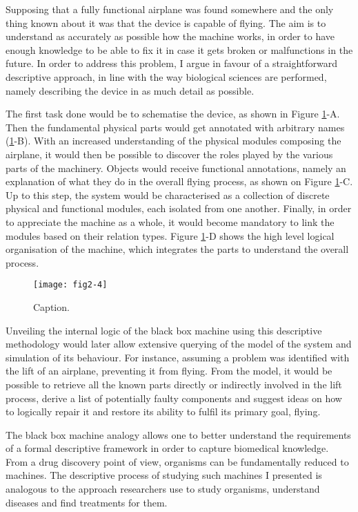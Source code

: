 Supposing that a fully functional airplane was found somewhere and the only thing known about it was that the device is capable of flying. The aim is to understand as accurately as possible how the machine works, in order to have enough knowledge to be able to fix it in case it gets broken or malfunctions in the future. In order to address this problem, I argue in favour of a straightforward descriptive approach, in line with the way biological sciences are performed, namely describing the device in as much detail as possible.

The first task done would be to schematise the device, as shown in Figure \ref{fig2-4}-A. Then the fundamental physical parts would get annotated with arbitrary names (\ref{fig2-4}-B). With an increased understanding of the physical modules composing the airplane, it would then be possible to discover the roles played by the various parts of the machinery. Objects would receive functional annotations, namely an explanation of what they do in the overall flying process, as shown on Figure \ref{fig2-4}-C. Up to this step, the system would be characterised as a collection of discrete physical and functional modules, each isolated from one another. Finally, in order to appreciate the machine as a whole, it would become mandatory to link the modules based on their relation types. Figure \ref{fig2-4}-D shows the high level logical organisation of the machine, which integrates the parts to understand the overall process.

\begin{figure}[H]
    \centering
    \texttt{[image: fig2-4]}
    \caption{Caption.}
    \label{fig2-4}
\end{figure}

Unveiling the internal logic of the black box machine using this descriptive methodology would later allow extensive querying of the model of the system and simulation of its behaviour. For instance, assuming a problem was identified with the lift of an airplane, preventing it from flying. From the model, it would be possible to retrieve all the known parts directly or indirectly involved in the lift process, derive a list of potentially faulty components and suggest ideas on how to logically repair it and restore its ability to fulfil its primary goal, flying.

The black box machine analogy allows one to better understand the requirements of a formal descriptive framework in order to capture biomedical knowledge. From a drug discovery point of view, organisms can be fundamentally reduced to machines. The descriptive process of studying such machines I presented is analogous to the approach researchers use to study organisms, understand diseases and find treatments for them.

